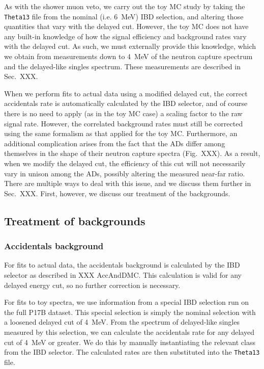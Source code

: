 \documentclass[../thesis.tex]{subfiles}
\begin{document}
As with the shower muon veto, we carry out the toy MC study by taking the \texttt{Theta13} file from the nominal (i.e. 6~MeV) IBD selection, and altering those quantities that vary with the delayed cut. However, the toy MC does not have any built-in knowledge of how the signal efficiency and background rates vary with the delayed cut. As such, we must externally provide this knowledge, which we obtain from measurements down to 4~MeV of the neutron capture spectrum and the delayed-like singles spectrum. These measurements are described in Sec.~XXX.

When we perform fits to actual data using a modified delayed cut, the correct accidentals rate is automatically calculated by the IBD selector, and of course there is no need to apply (as in the toy MC case) a scaling factor to the raw signal rate. However, the correlated background rates must still be corrected using the same formalism as that applied for the toy MC. Furthermore, an additional complication arises from the fact that the ADs differ among themselves in the shape of their neutron capture spectra (Fig.~XXX). As a result, when we modify the delayed cut, the efficiency of this cut will not necessarily vary in unison among the ADs, possibly altering the measured near-far ratio. There are multiple ways to deal with this issue, and we discuss them further in Sec.~XXX. First, however, we discuss our treatment of the backgrounds.

\subsection{Treatment of backgrounds}
\label{sec:cutVaryDelayedCutBkgTreatment}

\subsubsection{Accidentals background}

For fits to actual data, the accidentals background is calculated by the IBD selector as described in XXX AccAndDMC. This calculation is valid for any delayed energy cut, so no further correction is necessary.

For fits to toy spectra, we use information from a special IBD selection run on the full P17B dataset. This special selection is simply the nominal selection with a loosened delayed cut of 4~MeV. From the spectrum of delayed-like singles measured by this selection, we can calculate the accidentals rate for any delayed cut of 4~MeV or greater. We do this by manually instantiating the relevant class from the IBD selector. The calculated rates are then substituted into the \texttt{Theta13} file.
\end{document}
